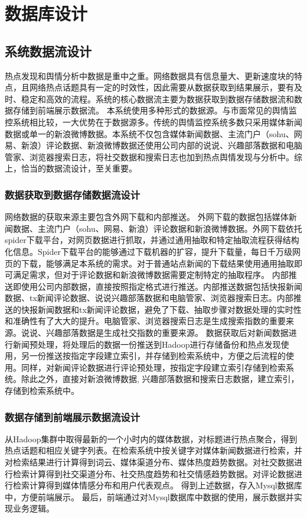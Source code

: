 \section{数据库设计}
\subsection{系统数据流设计}
热点发现和舆情分析中数据是重中之重。网络数据具有信息量大、更新速度块的特点，且网络热点话题具有一定的时效性，因此需要从数据获取到结果展示，要有及时、稳定和高效的流程。系统的核心数据流主要为数据获取到数据存储数据流和数据存储到前端展示数据流。
本系统使用多种形式的数据源。与市面常见的舆情监控系统相比较，一大优势在于数据源多。传统的舆情监控系统多数只采用媒体新闻数据或单一的新浪微博数据。本系统不仅包含媒体新闻数据、主流门户（sohu、网易、新浪）评论数据、新浪微博数据还使用公司内部的说说、兴趣部落数据和电脑管家、浏览器搜索日志，将社交数据和搜索日志也加到热点舆情发现与分析中。综上，恰当的数据流设计，至关重要。

\subsubsection{数据获取到数据存储数据流设计}
网络数据的获取来源主要包含外网下载和内部推送。
外网下载的数据包括媒体新闻数据、主流门户（sohu、网易、新浪）评论数据和新浪微博数据。外网下载依托spider下载平台，对网页数据进行抓取，并通过通用抽取和特定抽取流程获得结构化信息。Spider下载平台的能够通过下载机器的扩容，提升下载量，每日千万级网页的下载，能够满足本系统的需求。对于普通站点新闻的下载结果使用通用抽取即可满足需求，但对于评论数据和新浪微博数据需要定制特定的抽取程序。
内部推送即使用公司内部数据，直接按照指定格式进行推送。内部推送数据包括快报新闻数据、tx新闻评论数据、说说兴趣部落数据和电脑管家、浏览器搜索日志。内部推送的快报新闻数据和tx新闻评论数据，避免了下载、抽取步骤对数据处理的实时性和准确性有了大大的提升。电脑管家、浏览器搜索日志是生成搜索指数的重要来源。说说、兴趣部落数据是生成社交指数的重要来源。
数据获取后对新闻数据进行新闻预处理，将处理后的数据一份推送到Hadoop进行存储备份和热点发现使用，另一份推送按指定字段建立索引，并存储到检索系统中，方便之后流程的使用。同样，对新闻评论数据进行评论预处理，按指定字段建立索引存储到检索系统。除此之外，直接对新浪微博数据, 兴趣部落数据和搜索日志数据，建立索引，存储到检索系统中。

\subsubsection{数据存储到前端展示数据流设计}
从Hadoop集群中取得最新的一个小时内的媒体数据，对标题进行热点聚合，得到热点话题和相应关键字列表。在检索系统中按关键字对媒体新闻数据进行检索，并对检索结果进行计算得到词云、媒体渠道分布、媒体热度趋势数据。对社交数据进行检索计算得到社交渠道分布、社交热度趋势和社交情感趋势数据。对评论数据进行检索计算得到媒体情感分布和用户代表观点。
得到上述数据，存入Mysql数据库中，方便前端展示。
最后，前端通过对Mysql数据库中数据的使用，展示数据并实现业务逻辑。

